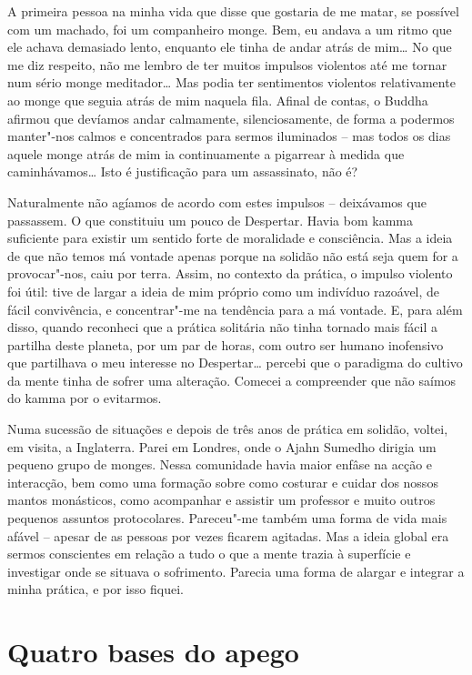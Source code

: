 A primeira pessoa na minha vida que disse que gostaria de me matar, se possível
com um machado, foi um companheiro monge. Bem, eu andava a um ritmo que ele
achava demasiado lento, enquanto ele tinha de andar atrás de mim\ldots{} No que
me diz respeito, não me lembro de ter muitos impulsos violentos até me tornar
num sério monge meditador\ldots{} Mas podia ter sentimentos violentos
relativamente ao monge que seguia atrás de mim naquela fila. Afinal de contas, o
Buddha afirmou que devíamos andar calmamente, silenciosamente, de forma a
podermos manter"-nos calmos e concentrados para sermos iluminados -- mas todos
os dias aquele monge atrás de mim ia continuamente a pigarrear à medida que
caminhávamos\ldots{} Isto é justificação para um assassinato, não é?

Naturalmente não agíamos de acordo com estes impulsos -- deixávamos que
passassem. O que constituiu um pouco de Despertar. Havia bom kamma suficiente
para existir um sentido forte de moralidade e consciência. Mas a ideia de que
não temos má vontade apenas porque na solidão não está seja quem for a
provocar"-nos, caiu por terra. Assim, no contexto da prática, o impulso violento
foi útil: tive de largar a ideia de mim próprio como um indivíduo razoável, de
fácil convivência, e concentrar"-me na tendência para a má vontade. E, para além
disso, quando reconheci que a prática solitária não tinha tornado mais fácil a
partilha deste planeta, por um par de horas, com outro ser humano inofensivo que
partilhava o meu interesse no Despertar\ldots{} percebi que o paradigma do
cultivo da mente tinha de sofrer uma alteração. Comecei a compreender que não
saímos do kamma por o evitarmos.

Numa sucessão de situações e depois de três anos de prática em solidão, voltei,
em visita, a Inglaterra. Parei em Londres, onde o Ajahn Sumedho dirigia um
pequeno grupo de monges. Nessa comunidade havia maior enfâse na acção e
interacção, bem como uma formação sobre como costurar e cuidar dos nossos mantos
monásticos, como acompanhar e assistir um professor e muito outros pequenos
assuntos protocolares. Pareceu"-me também uma forma de vida mais afável --
apesar de as pessoas por vezes ficarem agitadas. Mas a ideia global era sermos
conscientes em relação a tudo o que a mente trazia à superfície e investigar
onde se situava o sofrimento. Parecia uma forma de alargar e integrar a minha
prática, e por isso fiquei.

\section{Quatro bases do apego}


